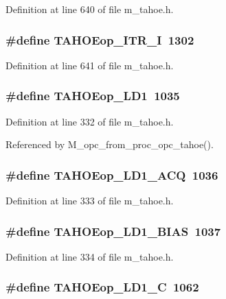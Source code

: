 Definition at line 640 of file m\_\-tahoe.h.
\subsubsection{\setlength{\rightskip}{0pt plus 5cm}\#define TAHOEop\_\-ITR\_\-I~1302}\label{m__tahoe_8h_cd711d93ed420d4ae202efc12bf108d6}




Definition at line 641 of file m\_\-tahoe.h.
\subsubsection{\setlength{\rightskip}{0pt plus 5cm}\#define TAHOEop\_\-LD1~1035}\label{m__tahoe_8h_ab19f97fed732e526ad50e5ce417f95f}




Definition at line 332 of file m\_\-tahoe.h.

Referenced by M\_\-opc\_\-from\_\-proc\_\-opc\_\-tahoe().
\subsubsection{\setlength{\rightskip}{0pt plus 5cm}\#define TAHOEop\_\-LD1\_\-ACQ~1036}\label{m__tahoe_8h_964b5290086a048b6d6ae09052890141}




Definition at line 333 of file m\_\-tahoe.h.
\subsubsection{\setlength{\rightskip}{0pt plus 5cm}\#define TAHOEop\_\-LD1\_\-BIAS~1037}\label{m__tahoe_8h_d0460e7898002648279de9071f71de3d}




Definition at line 334 of file m\_\-tahoe.h.
\subsubsection{\setlength{\rightskip}{0pt plus 5cm}\#define TAHOEop\_\-LD1\_\-C~1062}\label{m__tahoe_8h_dad74154f7edce3f4a6d68dff9d42afd}




